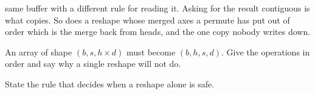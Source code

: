 \begin{testexercises}
{  same buffer with a different rule for reading it. Asking for the result
  contiguous is what copies. So does a reshape whose merged axes a permute has
  put out of order \dash{} which is the merge back from heads, and the one copy
  nobody writes down.}
\item An array of shape $(b, s, h \times d)$ must become $(b, h, s, d)$. Give
  the operations in order and say why a single reshape will not do.
\item State the rule that decides when a reshape alone is safe.
\end{testexercises}

